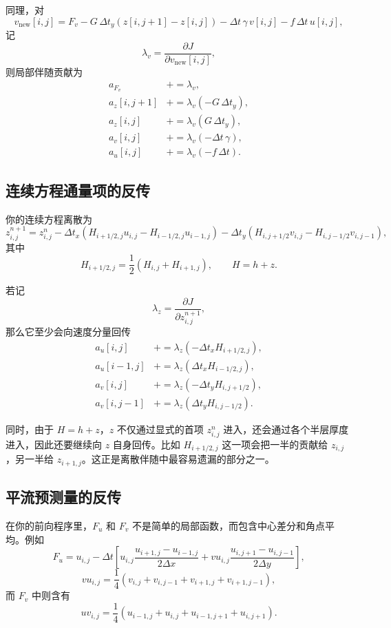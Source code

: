 \documentclass[12pt,a4paper,twoside]{article}
\begin{document}
同理，对
\[
v_{\text{new}}[i,j]
= F_v
- G \,\Delta t_y \left( z[i,j+1]-z[i,j] \right)
- \Delta t\,\gamma\, v[i,j]
- f\,\Delta t\, u[i,j],
\]
记
\[
\lambda_v = \frac{\partial J}{\partial v_{\text{new}}[i,j]},
\]
则局部伴随贡献为
\begin{align*}
a_{F_v} &\mathrel{+}= \lambda_v, \\
a_z[i,j+1] &\mathrel{+}= \lambda_v (-G\,\Delta t_y), \\
a_z[i,j] &\mathrel{+}= \lambda_v (G\,\Delta t_y), \\
a_v[i,j] &\mathrel{+}= \lambda_v (-\Delta t\,\gamma), \\
a_u[i,j] &\mathrel{+}= \lambda_v (-f\,\Delta t).
\end{align*}

\subsection*{连续方程通量项的反传}

你的连续方程离散为
\[
z_{i,j}^{n+1}
= z_{i,j}^{n}
- \Delta t_x \left( H_{i+1/2,j} u_{i,j} - H_{i-1/2,j} u_{i-1,j} \right)
- \Delta t_y \left( H_{i,j+1/2} v_{i,j} - H_{i,j-1/2} v_{i,j-1} \right),
\]
其中
\[
H_{i+1/2,j} = \frac{1}{2}(H_{i,j}+H_{i+1,j}), \qquad H = h+z.
\]

若记
\[
\lambda_z = \frac{\partial J}{\partial z_{i,j}^{n+1}},
\]
那么它至少会向速度分量回传
\begin{align*}
a_u[i,j] &\mathrel{+}= \lambda_z \left(-\Delta t_x H_{i+1/2,j}\right), \\
a_u[i-1,j] &\mathrel{+}= \lambda_z \left(\Delta t_x H_{i-1/2,j}\right), \\
a_v[i,j] &\mathrel{+}= \lambda_z \left(-\Delta t_y H_{i,j+1/2}\right), \\
a_v[i,j-1] &\mathrel{+}= \lambda_z \left(\Delta t_y H_{i,j-1/2}\right).
\end{align*}

同时，由于 $H=h+z$，$z$ 不仅通过显式的首项 $z_{i,j}^n$ 进入，还会通过各个半层厚度进入，因此还要继续向 $z$ 自身回传。比如 $H_{i+1/2,j}$ 这一项会把一半的贡献给 $z_{i,j}$，另一半给 $z_{i+1,j}$。这正是离散伴随中最容易遗漏的部分之一。

\subsection*{平流预测量的反传}

在你的前向程序里，$F_u$ 和 $F_v$ 不是简单的局部函数，而包含中心差分和角点平均。例如
\[
F_u
= u_{i,j}
- \Delta t
\left[
u_{i,j}\frac{u_{i+1,j}-u_{i-1,j}}{2\Delta x}
+ vu_{i,j}\frac{u_{i,j+1}-u_{i,j-1}}{2\Delta y}
\right],
\]
\[
vu_{i,j}
= \frac{1}{4}\left(
v_{i,j}+v_{i,j-1}+v_{i+1,j}+v_{i+1,j-1}
\right),
\]
而 $F_v$ 中则含有
\[
uv_{i,j}
= \frac{1}{4}\left(
u_{i-1,j}+u_{i,j}+u_{i-1,j+1}+u_{i,j+1}
\right).
\]
\end{document}
